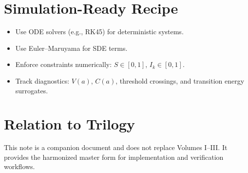 ﻿\documentclass[12pt,a4paper]{article}
\begin{document}
\section{Simulation-Ready Recipe}
\begin{itemize}
    \item Use ODE solvers (e.g., RK45) for deterministic systems.
    \item Use Euler--Maruyama for SDE terms.
    \item Enforce constraints numerically: $S\in[0,1]$, $I_k\in[0,1]$.
    \item Track diagnostics: $V(a)$, $C(a)$, threshold crossings, and transition energy surrogates.
\end{itemize}

\section*{Relation to Trilogy}
This note is a companion document and does not replace Volumes I--III. It provides the harmonized master form for implementation and verification workflows.
\end{document}
